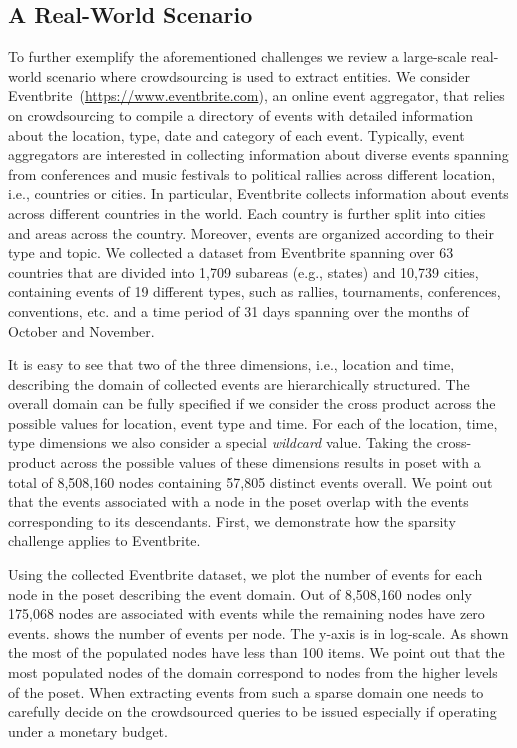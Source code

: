\subsection{A Real-World Scenario}
\label{sec:challenges}
To further exemplify the aforementioned challenges we review a large-scale real-world scenario where crowdsourcing is used to extract entities. 
We consider Eventbrite~(\url{https://www.eventbrite.com}), an online event aggregator, that relies on crowdsourcing to compile a directory of events with detailed information about the location, type, date and category of each event. Typically, event aggregators are interested in collecting information about diverse events spanning from conferences and music festivals to political rallies across different location, i.e., countries or cities. In particular, Eventbrite collects information about events across different countries in the world. Each country is further split into cities and areas across the country. Moreover, events are organized according to their type and topic. We collected a dataset from Eventbrite spanning over 63 countries that are divided into 1,709 subareas (e.g., states) and 10,739 cities, containing events of 19 different types, such as rallies, tournaments, conferences, conventions, etc. and a time period of 31 days spanning over the months of October and November. 

It is easy to see that two of the three dimensions, i.e., location and time, describing the domain of collected events  are hierarchically structured. The overall domain can be fully specified if we consider the cross product across the possible values for location, event type and time. For each of the location, time, type dimensions we also consider a special {\em wildcard} value. Taking the cross-product across the possible values of these dimensions results in poset with a total of 8,508,160 nodes containing 57,805 distinct events overall. We point out that the events associated with a node in the poset overlap with the events corresponding to its descendants. First, we demonstrate how the sparsity challenge applies to Eventbrite.
\begin{example}
Using the collected Eventbrite dataset, we plot the number of events for each node in the poset describing the event domain. Out of 8,508,160 nodes only 175,068 nodes are associated with events while the remaining nodes have zero events.  shows the number of events per node. The y-axis is in log-scale. As shown the most of the populated nodes have less than 100 items. We point out that the most populated nodes of the domain correspond to nodes from the higher levels of the poset. When extracting events from such a sparse domain one needs to carefully decide on the crowdsourced queries to be issued especially if operating under a monetary budget.
\end{example}

